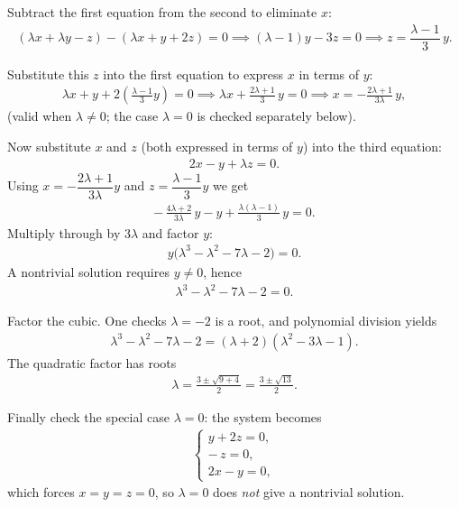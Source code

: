 \documentclass[journal]{IEEEtran}
\begin{document}
Subtract the first equation from the second to eliminate \(x\):
\begin{align*}
(\lambda x+\lambda y - z) - (\lambda x + y + 2z)=0
\implies (\lambda-1)y -3z =0
\implies z=\dfrac{\lambda-1}{3}\,y.
\end{align*}

Substitute this \(z\) into the first equation to express \(x\) in terms of \(y\):
\begin{align*}
\lambda x + y + 2\!\left(\frac{\lambda-1}{3}y\right)=0
\implies
\lambda x + \frac{2\lambda+1}{3}\,y = 0
\implies
x = -\frac{2\lambda+1}{3\lambda}\,y,
\end{align*}
(valid when \(\lambda\neq0\); the case \(\lambda=0\) is checked separately below).

Now substitute \(x\) and \(z\) (both expressed in terms of \(y\)) into the third equation:
\begin{align*}
2x - y + \lambda z = 0.
\end{align*}
Using \(x=-\dfrac{2\lambda+1}{3\lambda}y\) and \(z=\dfrac{\lambda-1}{3}y\) we get
\begin{align*}
-\,\frac{4\lambda+2}{3\lambda}\,y - y + \frac{\lambda(\lambda-1)}{3}\,y = 0.
\end{align*}
Multiply through by \(3\lambda\) and factor \(y\):
\begin{align*}
y\bigl(\lambda^3-\lambda^2-7\lambda-2\bigr)=0.
\end{align*}
A nontrivial solution requires \(y\neq0\), hence
\begin{align*}
\lambda^3-\lambda^2-7\lambda-2=0.
\end{align*}

Factor the cubic. One checks \(\lambda=-2\) is a root, and polynomial division yields
\begin{align*}
\lambda^3-\lambda^2-7\lambda-2=(\lambda+2)(\lambda^2-3\lambda-1).
\end{align*}
The quadratic factor has roots
\begin{align*}
\lambda=\frac{3\pm\sqrt{9+4}}{2}=\frac{3\pm\sqrt{13}}{2}.
\end{align*}

Finally check the special case \(\lambda=0\): the system becomes
\begin{align*}
\begin{cases}
y+2z=0,\\
-\,z=0,\\
2x-y=0,
\end{cases}
\end{align*}
which forces \(x=y=z=0\), so \(\lambda=0\) does \emph{not} give a nontrivial solution.
\end{document}
